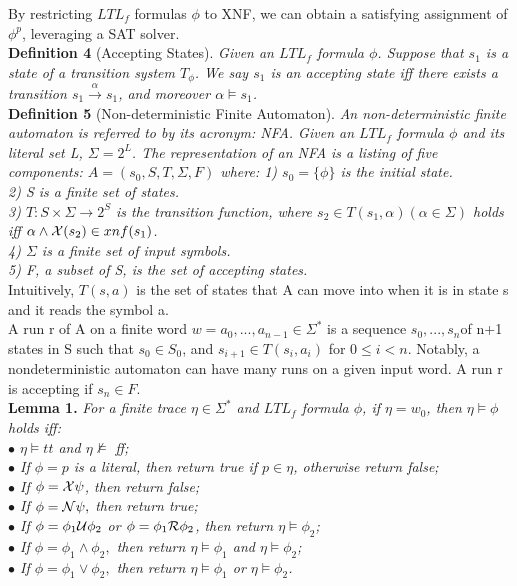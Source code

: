 By restricting $LTL_f$ formulas $\phi$ to XNF, we can obtain a satisfying assignment of $\phi^{p}$, leveraging a SAT solver.\\
{\bf Definition 4} (Accepting States). {\it Given an $LTL_f$ formula $\phi$. Suppose that $s_1$ is a state of a transition system $T_{\phi}$. We say  $s_1$ is an accepting state iff there exists a transition $ s_1 \overset{\alpha}{\rightarrow}s_1$, and moreover $\alpha \models s_1$. }   \\   
{\bf Definition 5} (Non-deterministic Finite Automaton). {\it An non-deterministic finite automaton is referred to by its acronym: NFA. Given an $LTL_f$ formula $\phi$ and its literal set L, $\Sigma = 2^{L}$. The representation of an NFA is a listing of five components: $A = (s_0,S, T, \Sigma, F)$ where:
1) $s_0 = \{\phi \}$ is the initial state.\\
2) S is a finite set of states.\\
3) $T:  S \times \Sigma \to 2^S$ is the transition function, where $s_2 \in T(s_1, \alpha) (\alpha \in \Sigma)$ holds iff $ \alpha \wedge \mathcal{X}(s_2) \in xnf(s_1)$.\\
4) $\Sigma$ is a finite set of input symbols.\\
5) F, a subset of S, is the set of accepting states.\\ }
Intuitively, $T(s, a)$ is the set of states that A can move into when it is in state s and it reads the symbol a.  \\
A run r of A on a finite word $w = a_0, ..., a_{n-1} \in \Sigma^{*}$ is a sequence $s_0, ..., s_n $of n+1 states in S such that $s_0 \in S_0$, and $s_{i+1} \in T(s_i, a_i)$ for $0 \leq i < n$. Notably, a nondeterministic automaton can have many runs on a given input word. A run r is accepting if $s_n \in F$.   \\
{\bf Lemma 1.}  {\it For a finite trace $\eta \in \Sigma^{*}$ and $LTL_f$ formula $\phi$, if $\eta = w_0$, then $\eta \models \phi$ holds iff: \\ 
$\bullet$ $\eta \models tt$ and $\eta \not \models $ ff;\\
$\bullet$ If $\phi=p$ is a literal, then return true if $p \in \eta$, otherwise return false;\\
$\bullet$ If $\phi=\mathcal{X} \psi$, then return false;\\
$\bullet$ If $\phi=\mathcal{N} \psi,$ then return true;\\
$\bullet$ If $\phi=\phi_{1} \mathcal{U} \phi_{2}$ or  $\phi=\phi_{1} \mathcal{R} \phi_{2}$, then return  $\eta \models \phi_{2}$; \\
$\bullet$ If $\phi=\phi_{1} \wedge \phi_{2},$ then return $\eta \models \phi_{1}$ and $\eta \models \phi_{2}$; \\
$\bullet$ If $\phi=\phi_{1} \vee \phi_{2},$ then return $\eta \models \phi_{1}$ or $\eta \models \phi_{2}$.}


